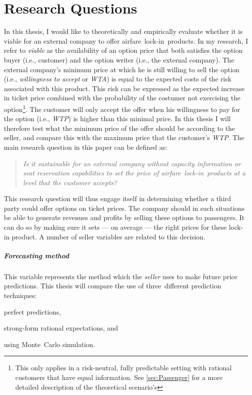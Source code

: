 \chapter{Research Questions}
\label{chap:ResearchQuestions}
In this thesis, I would like to theoretically and empirically evaluate whether it is viable for an external company to offer airfare~lock-in~products. In my research, I refer to \emph{viable} as the availability of an option price that both satisfies the option buyer (i.e., customer) and the option writer (i.e., the external company). The external company's minimum price at which he is still willing to sell the option (i.e., \emph{willingness to accept} or \emph{WTA}) is equal to the expected costs of the risk associated with this product. This risk can be expressed as the expected increase in ticket price combined with the probability of the costumer not exercising the option\footnote{This only applies in a risk-neutral, fully predictable setting with rational customers that have equal information. See \autoref{sec:Passenger} for a more detailed description of the theoretical scenario's}. The customer will only accept the offer when his willingness to pay for the option (i.e., \emph{WTP}) is higher than this minimal price. In this thesis I will therefore test what the minimum price of the offer should be according to the seller, and compare this with the maximum price that the customer's \emph{WTP}. The main research question in this paper can be defined as:

\begin{quote}\emph{Is it sustainable for an external company without capacity information or seat reservation capabilities to set the price of airfare~lock-in~products at a level that the customer accepts?}\end{quote}

This research question will thus engage itself in determining whether a third party could offer options on ticket prices. The company should in such situations be able to generate revenues and profits by selling these options to passengers. It can do so by making sure it sets --- on average --- the right prices for these lock-in product. A number of seller variables are related to this decision.

\paragraph{Forecasting method} This variable represents the method which the \emph{seller} uses to make future price predictions. This thesis will compare the use of three~different prediction techniques:
\begin{compactitem}
    \item perfect predictions,
    \item strong-form rational expectations, and
    \item using Monte~Carlo simulation.
\end{compactitem}

